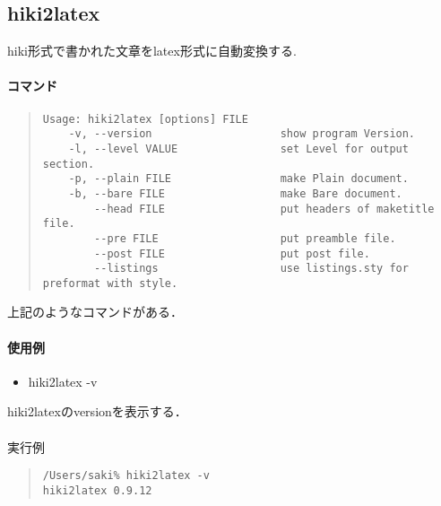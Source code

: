 \subsection{hiki2latex}
hiki形式で書かれた文章をlatex形式に自動変換する.

\paragraph{コマンド}\begin{quote}\begin{verbatim}
Usage: hiki2latex [options] FILE
    -v, --version                    show program Version.
    -l, --level VALUE                set Level for output section.
    -p, --plain FILE                 make Plain document.
    -b, --bare FILE                  make Bare document.
        --head FILE                  put headers of maketitle file.
        --pre FILE                   put preamble file.
        --post FILE                  put post file.
        --listings                   use listings.sty for preformat with style.
\end{verbatim}\end{quote}
\begin{description}
\item 上記のようなコマンドがある．
\end{description}

\paragraph{使用例}
\begin{itemize}
\item hiki2latex -v
\end{itemize}
\begin{description}
\item hiki2latexのversionを表示する．\\
\\
実行例
\end{description}
\begin{quote}\begin{verbatim}
/Users/saki% hiki2latex -v
hiki2latex 0.9.12

\end{verbatim}\end{quote}

